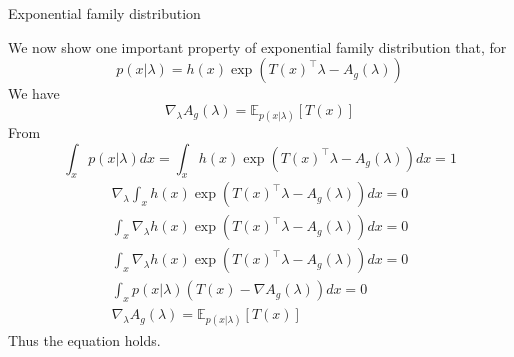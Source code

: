 \begin{frame}[allowframebreaks]{Exponential family distribution}
    \framebreak
    
    We now show one important property of exponential family distribution that, for $$p(x | \lambda) = h(x) \exp (T(x)^\top \lambda - A_g(\lambda))$$ We have $$\nabla_\lambda A_g(\lambda) = \mathbb{E}_{p(x | \lambda)}[T(x)]$$
    From 
    $$\int_x p(x | \lambda) dx = \int_x h(x) \exp (T(x)^\top \lambda - A_g(\lambda))dx = 1$$
    \begin{gather*}
    \nabla_\lambda \int_x h(x) \exp (T(x)^\top \lambda - A_g(\lambda))dx = 0 \\
    \int_x \nabla_\lambda h(x) \exp (T(x)^\top \lambda - A_g(\lambda))dx = 0 \\
    \int_x \nabla_\lambda h(x) \exp (T(x)^\top \lambda - A_g(\lambda))dx = 0 \\
    \int_x p(x | \lambda)(T(x) - \nabla A_g(\lambda))dx = 0 \\
    \nabla_\lambda A_g(\lambda) = \mathbb{E}_{p(x | \lambda)}[T(x)]
    \end{gather*}
    Thus the equation holds.
    
    \end{frame} 